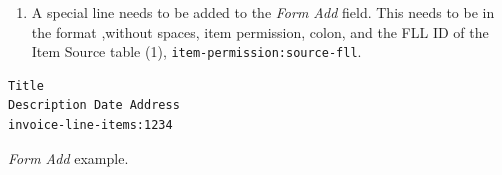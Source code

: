 \documentclass[11pt]{article}
\begin{document}
\begin{enumerate}
\begin{enumerate}
\begin{enumerate}
\item A special line needs to be added to the \emph{Form Add} field.
This needs to be in the format ,without spaces, item permission, colon, and the FLL ID of the Item Source table (1), \texttt{item-permission:source-fll}.
\end{enumerate}

\begin{listing}[htbp]
\begin{verbatim}
Title
Description Date Address
invoice-line-items:1234
\end{verbatim}
\caption{\emph{Form Add} example.}
\end{listing}
\end{enumerate}
\end{enumerate}
\end{document}
